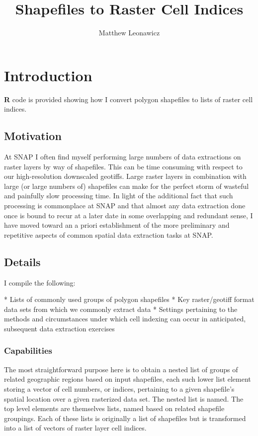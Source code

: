 \documentclass{article}\usepackage[]{graphicx}\usepackage[]{color}
\begin{document}
\title{Shapefiles to Raster Cell Indices}
\author{Matthew Leonawicz}
\maketitle



\section{Introduction}
\textbf{R} code is provided showing how I convert polygon shapefiles to lists of raster cell indices.

\subsection{Motivation}
At SNAP I often find myself performing large numbers of data extractions on raster layers by way of shapefiles.
This can be time consuming with respect to our high-resolution downscaled geotiffs.
Large raster layers in combination with large (or large numbers of) shapefiles can make for the perfect storm of wasteful and painfully slow processing time.
In light of the additional fact that such processing is commonplace at SNAP and that almost any data extraction done once is bound to recur at a later date in some overlapping and redundant sense,
I have moved toward an a priori establishment of the more preliminary and repetitive aspects of common spatial data extraction tasks at SNAP.

\subsection{Details}
I compile the following:

* Lists of commonly used groups of polygon shapefiles
* Key raster/geotiff format data sets from which we commonly extract data
* Settings pertaining to the methods and circumstances under which cell indexing can occur in anticipated, subsequent data extraction exercises

\subsubsection{Capabilities}
The most straightforward purpose here is to obtain a nested list of groups of related geographic regions based on input shapefiles,
each such lower list element storing a vector of cell numbers, or indices, pertaining to a given shapefile's spatial location over a given rasterized data set.
The nested list is named. The top level elements are themselves lists, named based on related shapefile groupings.
Each of these lists is originally a list of shapefiles but is transformed into a list of vectors of raster layer cell indices.
\end{document}
